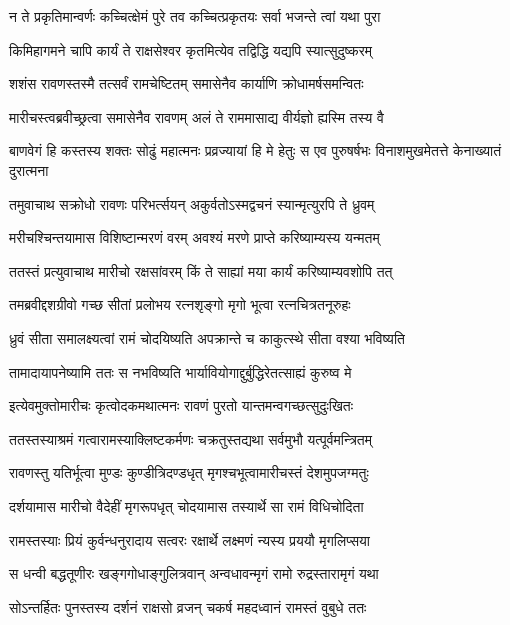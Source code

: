 \twolineshloka
{न ते प्रकृतिमान्वर्णः कच्चित्क्षेमं पुरे तव}
{कच्चित्प्रकृतयः सर्वा भजन्ते त्वां यथा पुरा}


\twolineshloka
{किमिहागमने चापि कार्यं ते राक्षसेश्वर}
{कृतमित्येव तद्विद्धि यद्यपि स्यात्सुदुष्करम्}


\twolineshloka
{शशंस रावणस्तस्मै तत्सर्वं रामचेष्टितम्}
{समासेनैव कार्याणि क्रोधामर्षसमन्वितः}


\twolineshloka
{मारीचस्त्वब्रवीच्छ्रत्वा समासेनैव रावणम्}
{अलं ते राममासाद्य वीर्यज्ञो ह्यस्मि तस्य वै}


\threelineshloka
{बाणवेगं हि कस्तस्य शक्तः सोढुं महात्मनः}
{प्रव्रज्यायां हि मे हेतुः स एव पुरुषर्षभः}
{विनाशमुखमेतत्ते केनाख्यातं दुरात्मना}


\twolineshloka
{तमुवाचाथ सक्रोधो रावणः परिभर्त्सयन्}
{अकुर्वतोऽस्मद्वचनं स्यान्मृत्युरपि ते ध्रुवम्}


\twolineshloka
{मरीचश्चिन्तयामास विशिष्टान्मरणं वरम्}
{अवश्यं मरणे प्राप्ते करिष्याम्यस्य यन्मतम्}


\twolineshloka
{ततस्तं प्रत्युवाचाथ मारीचो रक्षसांवरम्}
{किं ते साह्यां मया कार्यं करिष्याम्यवशोपि तत्}


\twolineshloka
{तमब्रवीद्दशग्रीवो गच्छ सीतां प्रलोभय}
{रत्नशृङ्गो मृगो भूत्वा रत्नचित्रतनूरुहः}


\twolineshloka
{ध्रुवं सीता समालक्ष्यत्वां रामं चोदयिष्यति}
{अपक्रान्ते च काकुत्स्थे सीता वश्या भविष्यति}


\twolineshloka
{तामादायापनेष्यामि ततः स नभविष्यति}
{भार्यावियोगाद्दुर्बुद्धिरेतत्साह्यं कुरुष्व मे}


\twolineshloka
{इत्येवमुक्तोमारीचः कृत्वोदकमथात्मनः}
{रावणं पुरतो यान्तमन्वगच्छत्सुदुःखितः}


\twolineshloka
{ततस्तस्याश्रमं गत्वारामस्याक्लिष्टकर्मणः}
{चक्रतुस्तद्यथा सर्वमुभौ यत्पूर्वमन्त्रितम्}


\twolineshloka
{रावणस्तु यतिर्भूत्वा मुण्डः कुण्डीत्रिदण्डधृत्}
{मृगश्चभूत्वामारीचस्तं देशमुपजग्मतुः}


\twolineshloka
{दर्शयामास मारीचो वैदेहीं मृगरूपधृत्}
{चोदयामास तस्यार्थे सा रामं विधिचोदिता}


\twolineshloka
{रामस्तस्याः प्रियं कुर्वन्धनुरादाय सत्वरः}
{रक्षार्थे लक्ष्मणं न्यस्य प्रययौ मृगलिप्सया}


\twolineshloka
{स धन्वी बद्धतूणीरः खङ्गगोधाङ्गुलित्रवान्}
{अन्वधावन्मृगं रामो रुद्रस्तारामृगं यथा}


\twolineshloka
{सोऽन्तर्हितः पुनस्तस्य दर्शनं राक्षसो व्रजन्}
{चकर्ष महदध्वानं रामस्तं वुबुधे ततः}


